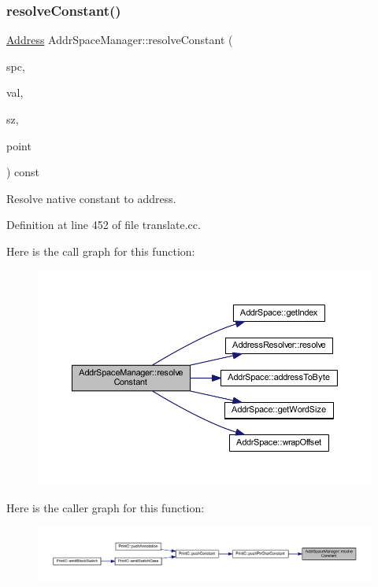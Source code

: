 \subsubsection{\texorpdfstring{resolveConstant()}{resolveConstant()}}
{\footnotesize\ttfamily \mbox{\hyperlink{class_address}{Address}} Addr\+Space\+Manager\+::resolve\+Constant (\begin{DoxyParamCaption}\item[{\mbox{\hyperlink{class_addr_space}{Addr\+Space}} $\ast$}]{spc,  }\item[{\mbox{\hyperlink{types_8h_a2db313c5d32a12b01d26ac9b3bca178f}{uintb}}}]{val,  }\item[{int4}]{sz,  }\item[{const \mbox{\hyperlink{class_address}{Address}} \&}]{point }\end{DoxyParamCaption}) const}



Resolve native constant to address. 



Definition at line 452 of file translate.\+cc.

Here is the call graph for this function\+:
\nopagebreak
\begin{figure}[H]
\begin{center}
\leavevmode
\includegraphics[width=350pt]{class_addr_space_manager_a346fe23bba76b07c9fe7ddea82995e1f_cgraph}
\end{center}
\end{figure}
Here is the caller graph for this function\+:
\nopagebreak
\begin{figure}[H]
\begin{center}
\leavevmode
\includegraphics[width=350pt]{class_addr_space_manager_a346fe23bba76b07c9fe7ddea82995e1f_icgraph}
\end{center}
\end{figure}
\mbox{\label{class_addr_space_manager_a107cb2ba1e4c562090ac1ad3b94cd16b}} 
